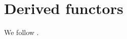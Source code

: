 \documentclass[../../../main]{subfiles}
\begin{document}
\chapter{Derived functors}

We follow \cite{weibelIntroductionHomologicalAlgebra1994}.




\end{document}
